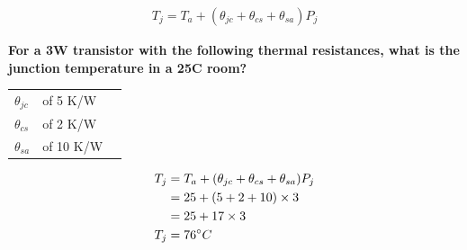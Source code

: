 \begin{gather*}
T_j = T_a + (\theta_{jc} + \theta_{cs} + \theta_{sa})P_j
\end{gather*}

\begin{framed}
\textbf{For a 3W transistor with the following thermal resistances, what is the junction temperature in a 25\degree C room?}
\begin{table}[H]
	\centering
    \begin{tabular}{lll}
    $\theta_{jc}$ & of 5 K/W \\
    $\theta_{cs}$ & of 2 K/W \\
    $\theta_{sa}$ & of 10 K/W
    \end{tabular}
\end{table}
\begin{align*}
T_j &= T_a + (\theta_{jc} + \theta_{cs} + \theta_{sa})P_j \\
    &= 25 + (5 + 2 + 10) \times 3 \\
    &= 25 + 17 \times 3 \\
T_j &= 76\degree C
\end{align*}
\end{framed}